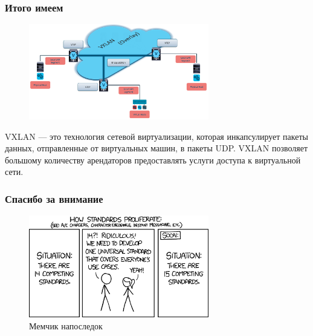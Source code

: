 \documentclass[aspectratio=169]{beamer}
\begin{document}
\begin{frame}
  \frametitle{Итого имеем}

  \begin{figure}[H]
    \centering
    \includegraphics[width=0.7\textwidth]{images/overlay.png}
  \end{figure}

  VXLAN --- это технология сетевой виртуализации, которая инкапсулирует пакеты
  данных, отправленные от виртуальных машин, в пакеты UDP. VXLAN позволяет
  большому количеству арендаторов предоставлять услуги доступа к виртуальной сети.
\end{frame}

\begin{frame}
  \frametitle{Спасибо за внимание}

  \begin{figure}[H]
    \centering
    \includegraphics[width=0.7\textwidth]{images/standards_2x.png}
    \caption{Мемчик напоследок}
  \end{figure}
\end{frame}
\end{document}
